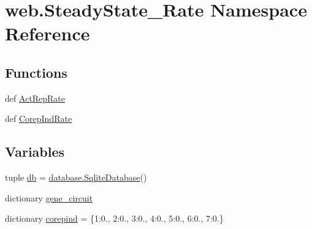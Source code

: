 \hypertarget{namespaceweb_1_1_steady_state___rate}{\section{web.\-Steady\-State\-\_\-\-Rate Namespace Reference}
\label{namespaceweb_1_1_steady_state___rate}
}
\subsection*{Functions}
\begin{DoxyCompactItemize}
\item 
def \hyperlink{namespaceweb_1_1_steady_state___rate_a447d9a9b1a6a654a9bd6b8b0bb0f5171}{Act\-Rep\-Rate}
\item 
def \hyperlink{namespaceweb_1_1_steady_state___rate_a3d8d7bb5a84d383873f40a1d1e2334a3}{Corep\-Ind\-Rate}
\end{DoxyCompactItemize}
\subsection*{Variables}
\begin{DoxyCompactItemize}
\item 
tuple \hyperlink{namespaceweb_1_1_steady_state___rate_a531f9391907dcb2ec8d4bd2097e49587}{db} = \hyperlink{classweb_1_1database_1_1_sqlite_database}{database.\-Sqlite\-Database}()
\item 
dictionary \hyperlink{namespaceweb_1_1_steady_state___rate_a3635765778627d1b462180a128f69c89}{gene\-\_\-circuit}
\item 
dictionary \hyperlink{namespaceweb_1_1_steady_state___rate_ac658de5480a1725ee5f7188e37d3c9e3}{corepind} = \{1\-:0., 2\-:0., 3\-:0., 4\-:0., 5\-:0., 6\-:0., 7\-:0.\}
\end{DoxyCompactItemize}


